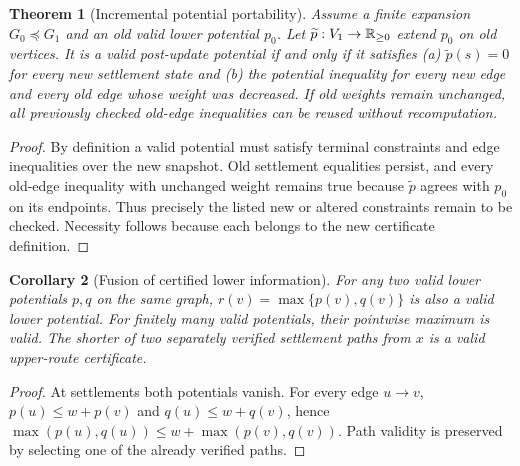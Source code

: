 \documentclass[11pt]{article}
\newtheorem{theorem}{Theorem}[section]
\newtheorem{corollary}[theorem]{Corollary}
\theoremstyle{definition}\newtheorem{definition}[theorem]{Definition}\newtheorem{assumption}[theorem]{Assumption}
\theoremstyle{remark}\newtheorem{remark}[theorem]{Remark}
\begin{document}
\begin{theorem}[Incremental potential portability]\label{thm:potportable}
Assume a finite expansion $G_0\preceq G_1$ and an old valid lower potential $p_0$. Let $\widetilde p:V_1\to\mathbb R_{\geq0}$ extend $p_0$ on old vertices. It is a valid post-update potential if and only if it satisfies (a) $\widetilde p(s)=0$ for every new settlement state and (b) the potential inequality for every new edge and every old edge whose weight was decreased. If old weights remain unchanged, all previously checked old-edge inequalities can be reused without recomputation.
\end{theorem}
\begin{proof}
By definition a valid potential must satisfy terminal constraints and edge inequalities over the new snapshot. Old settlement equalities persist, and every old-edge inequality with unchanged weight remains true because $\widetilde p$ agrees with $p_0$ on its endpoints. Thus precisely the listed new or altered constraints remain to be checked. Necessity follows because each belongs to the new certificate definition.
\end{proof}
\par

\begin{corollary}[Fusion of certified lower information]\label{cor:potmax}
For any two valid lower potentials $p,q$ on the same graph, $r(v)=\max\{p(v),q(v)\}$ is also a valid lower potential. For finitely many valid potentials, their pointwise maximum is valid. The shorter of two separately verified settlement paths from $x$ is a valid upper-route certificate.
\end{corollary}
\begin{proof}
At settlements both potentials vanish. For every edge $u\to v$, $p(u)\leq w+p(v)$ and $q(u)\leq w+q(v)$, hence $\max(p(u),q(u))\leq w+\max(p(v),q(v))$. Path validity is preserved by selecting one of the already verified paths.
\end{proof}
\par
\end{document}
